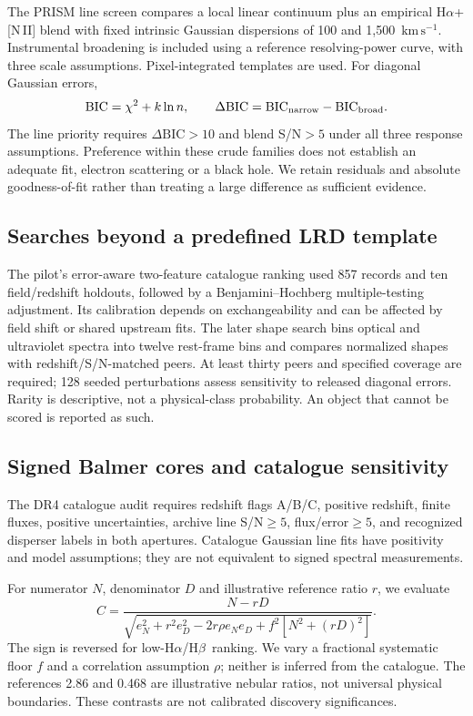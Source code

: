 \documentclass[11pt,a4paper]{article}
\newcommand{\ha}{H$\alpha$}
\newcommand{\hb}{H$\beta$}
\newcommand{\kms}{\ensuremath{\mathrm{km\,s^{-1}}}}
\begin{document}
The PRISM line screen compares a local linear continuum plus an empirical \ha+[N\,II] blend with fixed intrinsic Gaussian dispersions of 100 and 1,500~\kms. Instrumental broadening is included using a reference resolving-power curve, with three scale assumptions. Pixel-integrated templates are used. For diagonal Gaussian errors,
\begin{equation}
\mathrm{BIC}=\chi^2+k\ln n,\qquad
\Delta\mathrm{BIC}=\mathrm{BIC}_{\rm narrow}-\mathrm{BIC}_{\rm broad}.
\end{equation}
The line priority requires $\Delta\mathrm{BIC}>10$ and blend S/N$>5$ under all three response assumptions. Preference within these crude families does not establish an adequate fit, electron scattering or a black hole. We retain residuals and absolute goodness-of-fit rather than treating a large difference as sufficient evidence.

\subsection{Searches beyond a predefined LRD template}
The pilot's error-aware two-feature catalogue ranking used 857 records and ten field/redshift holdouts, followed by a Benjamini--Hochberg multiple-testing adjustment. Its calibration depends on exchangeability and can be affected by field shift or shared upstream fits. The later shape search bins optical and ultraviolet spectra into twelve rest-frame bins and compares normalized shapes with redshift/S/N-matched peers. At least thirty peers and specified coverage are required; 128 seeded perturbations assess sensitivity to released diagonal errors. Rarity is descriptive, not a physical-class probability. An object that cannot be scored is reported as such.

\subsection{Signed Balmer cores and catalogue sensitivity}
The DR4 catalogue audit requires redshift flags A/B/C, positive redshift, finite fluxes, positive uncertainties, archive line S/N$\ge5$, flux/error$\ge5$, and recognized disperser labels in both apertures. Catalogue Gaussian line fits have positivity and model assumptions; they are not equivalent to signed spectral measurements.

For numerator $N$, denominator $D$ and illustrative reference ratio $r$, we evaluate
\begin{equation}
C=\frac{N-rD}{\sqrt{e_N^2+r^2e_D^2-2r\rho e_Ne_D+
f^2[N^2+(rD)^2]}}.
\end{equation}
The sign is reversed for low-\ha/\hb\ ranking. We vary a fractional systematic floor $f$ and a correlation assumption $\rho$; neither is inferred from the catalogue. The references 2.86 and 0.468 are illustrative nebular ratios, not universal physical boundaries. These contrasts are not calibrated discovery significances.
\end{document}
